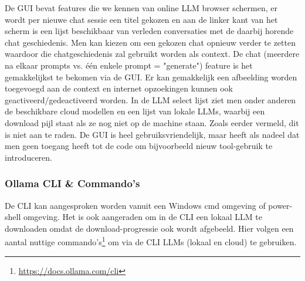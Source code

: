 De GUI bevat features die we kennen van online LLM browser schermen, er wordt per nieuwe chat sessie een titel gekozen en aan de linker kant van het scherm is een lijst beschikbaar van verleden conversaties met de daarbij horende chat geschiedenis. Men kan kiezen om een gekozen chat opnieuw verder te zetten waardoor die chatgeschiedenis zal gebruikt worden als context. De chat (meerdere na elkaar prompts vs. één enkele prompt = "generate") feature is het gemakkelijkst te bekomen via de GUI. Er kan gemakkelijk een afbeelding worden toegevoegd aan de context en internet opzoekingen kunnen ook geactiveerd/gedeactiveerd worden. In de LLM select lijst ziet men onder anderen de beschikbare cloud modellen en een lijst van lokale LLMs, waarbij een download pijl staat als ze nog niet op de machine staan. Zoals eerder vermeld, dit is niet aan te raden. De GUI is heel gebruiksvriendelijk, maar heeft als nadeel dat men geen toegang heeft tot de code om bijvoorbeeld nieuw tool-gebruik te introduceren.

\subsubsection{Ollama CLI \& Commando's}
\label{sssec:ollamacliandcommandos}

De CLI kan aangesproken worden vanuit een Windows cmd omgeving of power-shell omgeving. Het is ook aangeraden om in de CLI een lokaal LLM te downloaden omdat de download-progressie ook wordt afgebeeld. Hier volgen een aantal nuttige commando's\footnote{\href{https://docs.ollama.com/cli}{https://docs.ollama.com/cli}} om via de CLI LLMs (lokaal en cloud) te gebruiken. \\

